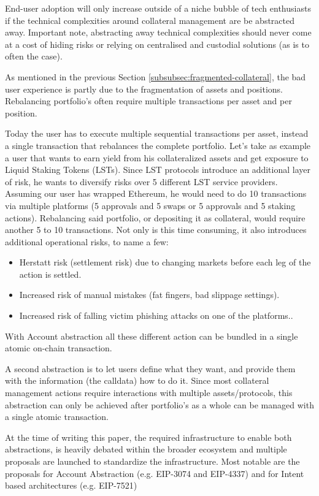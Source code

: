 \documentclass[sigconf,nonacm]{acmart}
\begin{document}
End-user adoption will only increase outside of a niche bubble of tech enthusiasts if the technical complexities around collateral management are be abstracted away.
Important note, abstracting away technical complexities should never come at a cost of hiding risks or relying on centralised and custodial solutions (as is to often the case).

As mentioned in the previous Section \ref{subsubsec:fragmented-collateral}, the bad user experience is partly due to the fragmentation of assets and positions.
Rebalancing portfolio's often require multiple transactions per asset and per position.

Today the user has to execute multiple sequential transactions per asset, instead a single transaction that rebalances the complete portfolio.
Let's take as example a user that wants to earn yield from his collateralized assets and get exposure to Liquid Staking Tokens (LSTs).
Since LST protocols introduce an additional layer of risk, he wants to diversify risks over 5 different LST service providers.
Assuming our user has wrapped Ethereum, he would need to do 10 transactions via multiple platforms (5 approvals and 5 swaps or 5 approvals and 5 staking actions).
Rebalancing said portfolio, or depositing it as collateral, would require another 5 to 10 transactions.
Not only is this time consuming, it also introduces additional operational risks, to name a few:
 \begin{itemize}
    \item Herstatt risk (settlement risk) due to changing markets before each leg of the action is settled.
    \item Increased risk of manual mistakes (fat fingers, bad slippage settings).
    \item Increased risk of falling victim phishing attacks on one of the platforms.. 
\end{itemize}
With Account abstraction all these different action can be bundled in a single atomic on-chain transaction.

A second abstraction is to let users define what they want, and provide them with the information (the calldata) how to do it.
Since most collateral management actions require interactions with multiple assets/protocols,
this abstraction can only be achieved after portfolio's as a whole can be managed with a single atomic transaction.

At the time of writing this paper, the required infrastructure to enable both abstractions, is heavily debated within the broader ecosystem and multiple proposals are launched to standardize the infrastructure.
Most notable are the proposals for Account Abstraction (e.g. EIP-3074 and EIP-4337) and for Intent based architectures (e.g. EIP-7521)
\end{document}

